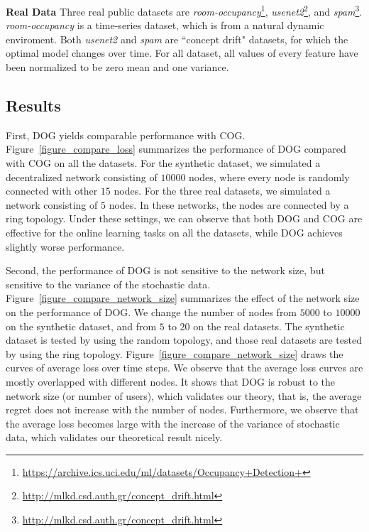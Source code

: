 \documentclass{article}
\begin{document}
\textbf{Real Data}
Three real public datasets are \textit{room-occupancy}\footnote{\url{https://archive.ics.uci.edu/ml/datasets/Occupancy+Detection+}},  \textit{usenet2}\footnote{\url{http://mlkd.csd.auth.gr/concept_drift.html}}, and \textit{spam}\footnote{\url{http://mlkd.csd.auth.gr/concept_drift.html}}. \textit{room-occupancy} is a time-series dataset, which is from a natural dynamic enviroment. Both \textit{usenet2} and \textit{spam} are  ``concept drift" \citep{Katakis:2010:TR} datasets, for which the optimal model changes over time. For all dataset, all values of every feature have been normalized to be zero mean and one variance.


\subsection{Results}

First, DOG yields comparable performance with COG. Figure~\ref{figure_compare_loss} summarizes the performance of DOG compared with COG on all the datasets. 
For the synthetic dataset, we simulated a decentralized network consisting of $10000$ nodes, where every node is randomly connected with other $15$ nodes.
For the three real datasets, we simulated a network consisting of $5$ nodes. 
In these networks, the nodes are connected by a ring topology. 
Under these settings, we can observe that both DOG and COG are effective for the online learning tasks on all the datasets, while DOG achieves slightly worse performance. 


Second, the performance of DOG is not sensitive to the network size, but sensitive to the variance of the stochastic data. Figure~\ref{figure_compare_network_size} summarizes the effect of the network size on the performance of DOG. We change the number of nodes from $5000$ to $10000$ on the synthetic dataset, and from $5$ to $20$ on the real datasets. The synthetic dataset is tested by using the random topology, and those real datasets are tested by using the ring topology. Figure~\ref{figure_compare_network_size} draws the curves of average loss over time steps. We observe that the average loss curves are mostly overlapped with different nodes. It shows that DOG is robust to the network size (or number of users), which validates our theory, that is, the average regret does not increase with the number of nodes. Furthermore, we observe that the average loss becomes large with the increase of the variance of stochastic data, which validates our theoretical result nicely.  
\end{document}
